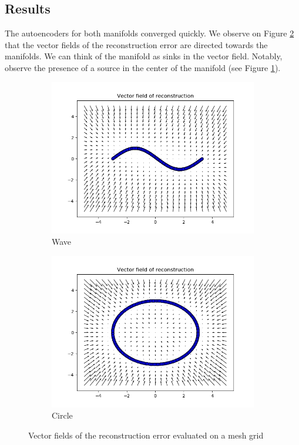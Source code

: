 \subsection*{Results}

The autoencoders for both manifolds converged quickly. We observe on Figure \ref{fig:exp1-vector-fields} that the vector fields of the reconstruction error are directed towards the manifolds. We can think of the manifold as sinks in the vector field. Notably, observe the presence of a source in the center of the manifold (see Figure \ref{fig:exp1-vf-circle}).
\begin{figure}[!h]
\centering
\begin{subfigure}{.5\textwidth}
  \centering
  \includegraphics[width=.95\linewidth]{figures/wave-vector-field}
  \caption{Wave}
\end{subfigure}%
\begin{subfigure}{.5\textwidth}
  \centering
  \includegraphics[width=.95\linewidth]{figures/circle-vector-field}
  \caption{Circle}
  \label{fig:exp1-vf-circle}
\end{subfigure}
\caption[Vector fields on wave and circle manifold]{Vector fields of the reconstruction error evaluated on a mesh grid}
\label{fig:exp1-vector-fields}
\end{figure}

